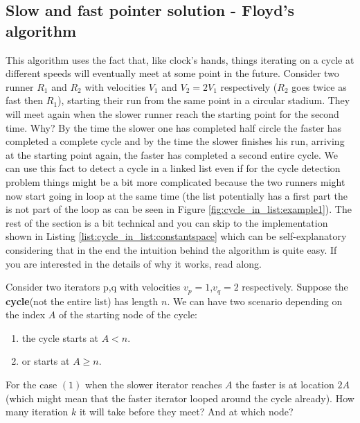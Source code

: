 



\subsection{Slow and fast pointer solution - Floyd’s algorithm }
\label{cycle_in_list:sec:slowfast}
This algorithm\cite{cit::wiki::floyd} uses the fact that, like clock's hands, things iterating on a
cycle at different speeds will eventually meet at some point in the future. Consider two runner $R_1$
and $R_2$ with velocities $V_1$ and $V_2=2V_1$ respectively ($R_2$ goes twice as fast then $R_1$),
starting their run from the same point in a circular stadium. They will meet again when the slower
runner reach the starting point for the second time. Why? By the time the slower one has completed
half circle the faster has completed a complete cycle and by the time the slower finishes his run,
arriving at the starting point again, the faster has completed a second entire cycle. We can use
this fact to detect a cycle in a linked list even if for the cycle detection problem things might be
a bit more complicated because the two runners might now start going in loop at the same time (the
list potentially has a first part the is not part of the loop as can be seen in Figure
\ref{fig:cycle_in_list:example1}). The rest of the section is a bit technical and you can skip to
the implementation shown in Listing \ref{list:cycle_in_list:constantspace} which can be self-explanatory considering that in the end the intuition behind the algorithm is quite easy. If you
are interested in the details of why it works, read along. 

Consider two iterators p,q with velocities $v_p=1$,$v_q=2$  respectively. Suppose the
\textbf{cycle}(not the entire list) has length $n$. We can have two scenario depending on the index
$A$ of the starting node of the cycle:

\begin{enumerate}
\item the cycle starts at $A < n$.
\item or  starts at \(A \geq n\).
\end{enumerate}

For the case $(1)$ when the slower iterator reaches $A$ the faster is at location $2A$ (which might
mean that the faster iterator looped around the cycle already). How many iteration $k$ it will take
before they meet? And at which node?

